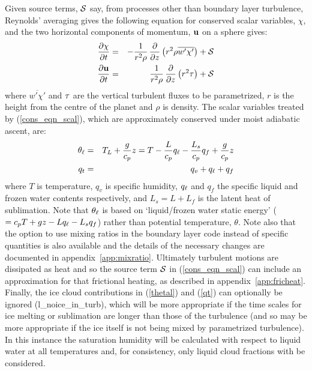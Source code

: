 \documentclass{UMDP_article}
\begin{document}
Given source terms, ${\cal S}$ say, from processes other than boundary
layer turbulence, Reynolds' averaging gives the following equation for
conserved scalar variables, $\chi$, and the two horizontal components
of momentum, ${\bf u}$ on a sphere gives:
\begin{eqnarray}
  \frac{\partial \chi}{\partial t}
  &=& - \frac{1}{r^2 \rho} \, \frac{\partial }{\partial z} \left( r^2 \rho \overline{w'\chi'} \right) 
  + {\cal S}
  \label{cons_eqn_scal} \\
  \frac{\partial {\bf u}}{\partial t}
  &=& \frac{1}{r^2 \rho} \, \frac{\partial }{\partial z} \left( r^2 {\bf \tau} \right) 
  + {\cal S}
  \label{cons_eqn_uv}
\end{eqnarray}
where $\overline{w'\chi'}$ and ${\bf \tau}$ are the vertical turbulent
fluxes to be parametrized, $r$ is the height from the centre of the
planet and $\rho$ is density.  The scalar variables treated by
(\ref{cons_eqn_scal}), which are approximately conserved under moist
adiabatic ascent, are:
\begin{eqnarray}
  \theta_{\ell} &=& T_L + \frac{g}{c_p} z = T - \frac{L}{c_p} q_{\ell} 
                  - \frac{L_s}{c_p} q_f + \frac{g}{c_p} z   \label{thetal} \\
  q_t &=& q_v + q_{\ell} + q_f \label{qt}
\end{eqnarray}
where $T$ is temperature, $q_v$ is specific humidity, $q_{\ell}$ and $q_f$
the specific liquid and frozen water contents respectively, and
$L_s=L+L_f$ is the latent heat of sublimation.  Note that $\theta_{\ell}$ is
based on `liquid/frozen water static energy' ($= c_p T + g z - L q_{\ell} -
L_s q_f$) rather than potential temperature, $\theta$.  Note also that
the option to use mixing ratios in the boundary layer code instead of
specific quantities is also available and the details of the necessary
changes are documented in appendix~\ref{app:mixratio}.  Ultimately
turbulent motions are dissipated as heat and so the source term ${\cal
  S}$ in (\ref{cons_eqn_scal}) can include an approximation for that
frictional heating, as described in appendix~\ref{app:fricheat}.
Finally, the ice cloud contributions in (\ref{thetal}) and (\ref{qt}) can 
optionally be ignored (l\_noice\_in\_turb), which will be more appropriate if 
the time scales for ice melting or sublimation are longer than those of the 
turbulence (and so may be more appropriate if the ice itself is not being 
mixed by parametrized turbulence).  In this instance the saturation humidity 
will be calculated with respect to liquid water at all temperatures and, for 
consistency, only liquid cloud fractions with be considered.
\end{document}

